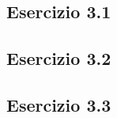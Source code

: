\subsection{\textbf{Esercizio 3.1}}

\subsection{\textbf{Esercizio 3.2}}

\subsection{\textbf{Esercizio 3.3}}
